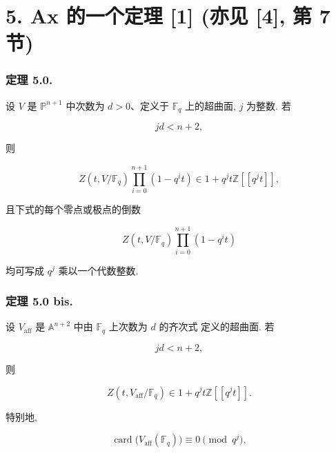 \section*{5. Ax 的一个定理 [1] (亦见 [4], 第 7 节)}

\subsubsection*{定理 5.0.}
设 $V$ 是 $\mathbb P^{n+1}$ 中次数为 $d>0$、定义于 $\mathbb F_q$ 上的超曲面,
$j$ 为整数. 若

\begin{equation}\tag{5.0.1}
jd<n+2,
\end{equation}

则

\begin{equation}\tag{5.0.2}
Z(t,V/\mathbb F_q)\prod_{i=0}^{n+1}(1-q^it)
\in1+q^jt\mathbb Z[[q^jt]],
\end{equation}

且下式的每个零点或极点的倒数

\begin{equation}\tag{5.0.3}
Z(t,V/\mathbb F_q)\prod_{i=0}^{n+1}(1-q^it)
\end{equation}

\noindent
均可写成 $q^j$ 乘以一个代数整数.

\subsubsection*{定理 5.0 bis.}
设 $V_{\mathrm{aff}}$ 是 $\mathbb A^{n+2}$ 中由 $\mathbb F_q$ 上次数为 $d$ 的齐次式
定义的超曲面. 若

\begin{equation}\tag{5.0.4}
jd<n+2,
\end{equation}

则

\begin{equation}\tag{5.0.5}
Z(t,V_{\mathrm{aff}}/\mathbb F_q)
\in1+q^jt\mathbb Z[[q^jt]].
\end{equation}

特别地,

\begin{equation}\tag{5.0.6}
\operatorname{card}\bigl(V_{\mathrm{aff}}(\mathbb F_q)\bigr)
\equiv0\pmod{q^j},
\end{equation}

